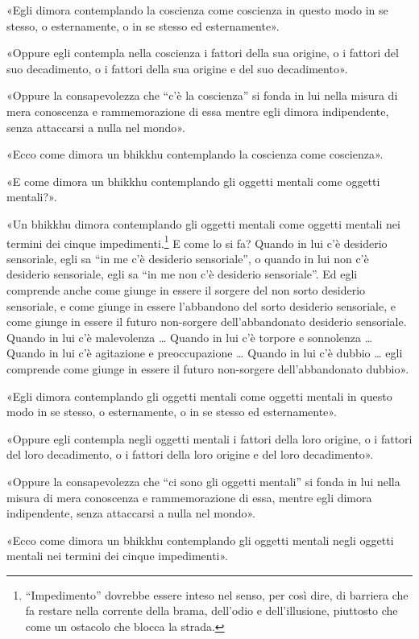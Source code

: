 «Egli dimora contemplando la coscienza come coscienza in questo modo in se
stesso, o esternamente, o in se stesso ed esternamente».

«Oppure egli contempla nella coscienza i fattori della sua origine, o i fattori
del suo decadimento, o i fattori della sua origine e del suo decadimento».

«Oppure la consapevolezza che “c’è la coscienza” si fonda in lui nella misura di
mera conoscenza e rammemorazione di essa mentre egli dimora indipendente, senza
attaccarsi a nulla nel mondo».

«Ecco come dimora un bhikkhu contemplando la coscienza come coscienza».

«E come dimora un bhikkhu contemplando gli oggetti mentali come oggetti
mentali?».

«Un bhikkhu dimora contemplando gli oggetti mentali come oggetti mentali nei
termini dei cinque impedimenti.\footnote{“Impedimento” dovrebbe essere inteso
  nel senso, per così dire, di barriera che fa restare nella corrente della
  brama, dell’odio e dell’illusione, piuttosto che come un ostacolo che blocca
  la strada.} E come lo si fa? Quando in lui c’è desiderio sensoriale, egli sa
“in me c’è desiderio sensoriale”, o quando in lui non c’è desiderio sensoriale,
egli sa “in me non c’è desiderio sensoriale”. Ed egli comprende anche come
giunge in essere il sorgere del non sorto desiderio sensoriale, e come giunge in
essere l’abbandono del sorto desiderio sensoriale, e come giunge in essere il
futuro non-sorgere dell’abbandonato desiderio sensoriale. Quando in lui c’è
malevolenza … Quando in lui c’è torpore e sonnolenza … Quando in lui c’è
agitazione e preoccupazione … Quando in lui c’è dubbio … egli comprende come
giunge in essere il futuro non-sorgere dell’abbandonato dubbio».

«Egli dimora contemplando gli oggetti mentali come oggetti mentali in questo
modo in se stesso, o esternamente, o in se stesso ed esternamente».

«Oppure egli contempla negli oggetti mentali i fattori della loro origine, o i
fattori del loro decadimento, o i fattori della loro origine e del loro
decadimento».

«Oppure la consapevolezza che “ci sono gli oggetti mentali” si fonda in lui
nella misura di mera conoscenza e rammemorazione di essa, mentre egli dimora
indipendente, senza attaccarsi a nulla nel mondo».

«Ecco come dimora un bhikkhu contemplando gli oggetti mentali negli oggetti
mentali nei termini dei cinque impedimenti».

